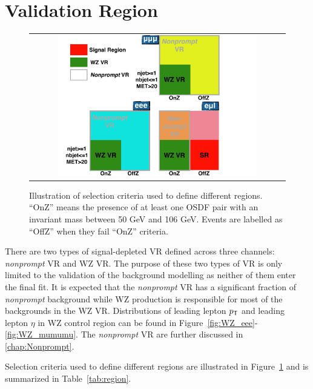 \section{Validation Region}
\label{sec:VR}

\begin{figure}[tbh!]
 \begin{center}
 \begin{tabular}{c}
 \includegraphics[width=0.8\textwidth]{figures/Part3/Selection/Event}
 \end{tabular}
 \caption{Illustration of selection criteria used to define different regions. ``OnZ'' means the presence of at least one \ac{OSDF} pair with an invariant mass between 50 GeV and 106 GeV. Events are labelled as ``OffZ'' when they fail ``OnZ'' criteria.}
 \label{fig:Event}
 \end{center}
\end{figure}

There are two types of signal-depleted \ac{VR} defined across three channels: \emph{nonprompt} \ac{VR} and WZ \ac{VR}. The purpose of these two types of \ac{VR} is only limited to the validation of the background modelling as neither of them enter the final fit. It is expected that the \emph{nonprompt} \ac{VR} has a significant fraction of \emph{nonprompt} background while WZ production is responsible for most of the backgrounds in the WZ \ac{VR}. Distributions of leading lepton $p_{\textsf{T}}$ and leading lepton $\eta$ in WZ control region can be found in Figure~\ref{fig:WZ_eee}-\ref{fig:WZ_mumumu}. The \emph{nonprompt} \ac{VR} are further discussed in \autoref{chap:Nonprompt}.

Selection criteria used to define different regions are illustrated in Figure~\ref{fig:Event} and is summarized in Table~\ref{tab:region}.

